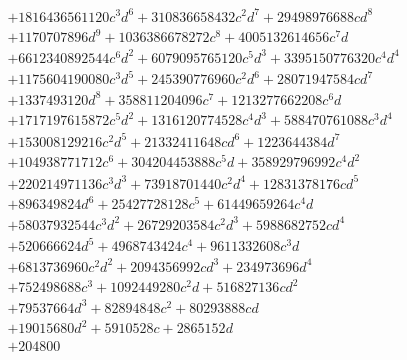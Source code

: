 {\begin{align*}
&+1816436561120c^{3}d^{6}+310836658432c^{2}d^{7}+29498976688cd^{8}\\
&+1170707896d^{9}+1036386678272c^{8}+4005132614656c^{7}d\\
&+6612340892544c^{6}d^{2}+6079095765120c^{5}d^{3}+3395150776320c^{4}d^{4}\\
&+1175604190080c^{3}d^{5}+245390776960c^{2}d^{6}+28071947584cd^{7}\\
&+1337493120d^{8}+358811204096c^{7}+1213277662208c^{6}d\\
&+1717197615872c^{5}d^{2}+1316120774528c^{4}d^{3}+588470761088c^{3}d^{4}\\
&+153008129216c^{2}d^{5}+21332411648cd^{6}+1223644384d^{7}\\
&+104938771712c^{6}+304204453888c^{5}d+358929796992c^{4}d^{2}\\
&+220214971136c^{3}d^{3}+73918701440c^{2}d^{4}+12831378176cd^{5}\\
&+896349824d^{6}+25427728128c^{5}+61449659264c^{4}d\\
&+58037932544c^{3}d^{2}+26729203584c^{2}d^{3}+5988682752cd^{4}\\
&+520666624d^{5}+4968743424c^{4}+9611332608c^{3}d\\
&+6813736960c^{2}d^{2}+2094356992cd^{3}+234973696d^{4}\\
&+752498688c^{3}+1092449280c^{2}d+516827136cd^{2}\\
&+79537664d^{3}+82894848c^{2}+80293888cd\\
&+19015680d^{2}+5910528c+2865152d\\
&+204800
\end{align*}
}

